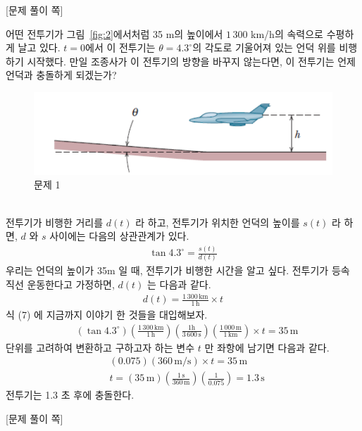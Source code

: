 \documentclass[APS,floatfix,nofootinbib,superscriptaddress,fleqn,preprint]{revtex4}
\begin{document}
{\color{gray} [문제 풀이 쪽]}

\newpage 

어떤 전투기가 그림~\ref{fig:2}에서처럼
35 m의 높이에서 $1\,300$ km/h의 속력으로 수평하게 날고 있다. $t=0$에서
이 전투기는 $\theta=4.3^\circ$의 각도로 기울어져 있는 언덕 위를
비행하기 시작했다. 만일 조종사가 이 전투기의 방향을 바꾸지 않는다면,
이 전투기는 언제 언덕과 충돌하게 되겠는가? 
\begin{figure}[ht]
  \centering
\includegraphics[scale=1.0]{Qfig3-2.pdf}  
  \caption{문제 1}
  \label{fig:1}
\end{figure} \\
전투기가 비행한 거리를 $d(t)$ 라 하고, 전투기가 위치한 언덕의 높이를 $s(t)$ 라 하면, $d$ 와 $s$ 사이에는 다음의 상관관계가 있다.
\begin{align}
  \tan{4.3^\circ} =\frac{s(t)}{d(t)} 
\end{align}
우리는 언덕의 높이가 35m 일 때, 전투기가 비행한 시간을 알고 싶다. 전투기가 등속 직선 운동한다고 가정하면, $d(t)$ 는 다음과 같다.
\begin{align}
  d(t) = \frac{1\,300\,\mathrm{km}}{1\,\mathrm{h}}\times t
\end{align}
식 (7) 에 지금까지 이야기 한 것들을 대입해보자.
\begin{align}
  &\left(\tan{4.3^\circ}\right) \left(\frac{1\,300\,\mathrm{km}}{1\,\mathrm{h}}\right) \left(\frac{1\mathrm{h}}{3\,600\,\mathrm{s}}\right) \left(\frac{1\,000\,\mathrm{m}}{1\,\mathrm{km}}\right) \times t = 35\,\mathrm{m}
\end{align}
단위를 고려하여 변환하고 구하고자 하는 변수 $t$ 만 좌항에 남기면 다음과 같다.
\begin{align}    
  &\left(0.075\right) (360\,\mathrm{m/s})\times t = 35\,\mathrm{m} \\
  &t=\left(35\,\mathrm{m}\right)\left(\frac{1\,\mathrm{s}}{360\,\mathrm{m}}\right) \left(\frac{1}{0.075}\right) = 1.3\,\mathrm{s}
\end{align}
전투기는 1.3 초 후에 충돌한다.
\newpage

{\color{gray} [문제 풀이 쪽]}
\end{document}
